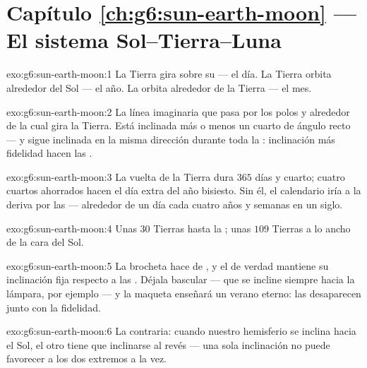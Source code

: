 \section*{Capítulo \ref{ch:g6:sun-earth-moon} --- El sistema Sol--Tierra--Luna}

\begin{solution}{exo:g6:sun-earth-moon:1}
La Tierra gira sobre su  --- el día. La Tierra orbita
alrededor del Sol --- el año. La  orbita alrededor de la
Tierra --- el mes.
\end{solution}

\begin{solution}{exo:g6:sun-earth-moon:2}
La línea imaginaria que pasa por los polos y alrededor de la cual gira
la Tierra. Está inclinada más o menos un cuarto de ángulo recto --- y
sigue inclinada en la misma dirección durante toda la :
inclinación más fidelidad hacen las .
\end{solution}

\begin{solution}{exo:g6:sun-earth-moon:3}
La vuelta de la Tierra dura $365$ días y cuarto; cuatro cuartos
ahorrados hacen el día extra del año bisiesto. Sin él, el calendario
iría a la deriva por las  --- alrededor de un día cada
cuatro años y semanas en un siglo.
\end{solution}

\begin{solution}{exo:g6:sun-earth-moon:4}
Unas $30$ Tierras hasta la ; unas $109$ Tierras a lo ancho de la
cara del Sol.
\end{solution}

\begin{solution}{exo:g6:sun-earth-moon:5}
La brocheta hace de , y el  de verdad mantiene su
inclinación fija respecto a las . Déjala bascular --- que
se incline siempre hacia la lámpara, por ejemplo --- y la maqueta
enseñará un verano eterno: las  desaparecen junto con la
fidelidad.
\end{solution}

\begin{solution}{exo:g6:sun-earth-moon:6}
La contraria: cuando nuestro hemisferio se inclina hacia el Sol, el
otro tiene que inclinarse al revés --- una sola inclinación no puede
favorecer a los dos extremos a la vez.
\end{solution}

